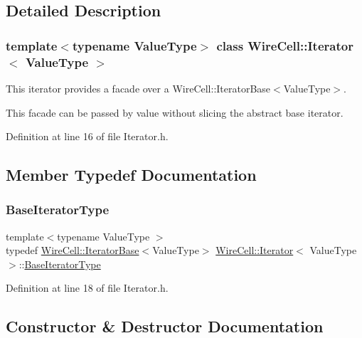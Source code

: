 \subsection{Detailed Description}
\subsubsection*{template$<$typename Value\+Type$>$\newline
class Wire\+Cell\+::\+Iterator$<$ Value\+Type $>$}

This iterator provides a facade over a Wire\+Cell\+::\+Iterator\+Base$<$\+Value\+Type$>$.

This facade can be passed by value without slicing the abstract base iterator. 

Definition at line 16 of file Iterator.\+h.



\subsection{Member Typedef Documentation}
\mbox{\label{class_wire_cell_1_1_iterator_a06a62ddc776c46b8ff2f26c1e1c90546}} 
\subsubsection{\texorpdfstring{Base\+Iterator\+Type}{BaseIteratorType}}
{\footnotesize\ttfamily template$<$typename Value\+Type $>$ \\
typedef \hyperlink{class_wire_cell_1_1_iterator_base}{Wire\+Cell\+::\+Iterator\+Base}$<$Value\+Type$>$ \hyperlink{class_wire_cell_1_1_iterator}{Wire\+Cell\+::\+Iterator}$<$ Value\+Type $>$\+::\hyperlink{class_wire_cell_1_1_iterator_a06a62ddc776c46b8ff2f26c1e1c90546}{Base\+Iterator\+Type}}



Definition at line 18 of file Iterator.\+h.



\subsection{Constructor \& Destructor Documentation}
\mbox{\label{class_wire_cell_1_1_iterator_a12de861cdfb0c90393d38996e1327ea9}} 
